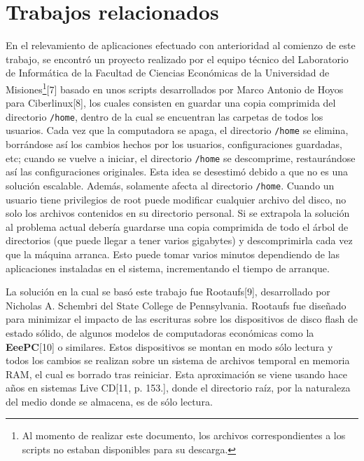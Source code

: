 \documentclass[final,narroweqnarray,inline,twoside]{ieee}
\newcommand{\itref}[1]{[{#1}]}
\begin{document}
\section{Trabajos relacionados}
En el relevamiento de aplicaciones efectuado con anterioridad al comienzo de este trabajo, se encontró un proyecto realizado por el equipo técnico del Laboratorio de Informática de la Facultad de Ciencias Económicas de la Universidad de Misiones\footnote{Al momento de realizar este documento, los archivos correspondientes a los scripts no estaban disponibles para su descarga.}\itref{7} basado en unos scripts desarrollados por Marco Antonio de Hoyos para Ciberlinux\itref{8}, los cuales consisten en guardar una copia comprimida del directorio \texttt{/home}, dentro de la cual se encuentran las carpetas de todos los usuarios. Cada vez que la computadora se apaga, el directorio \texttt{/home} se elimina, borrándose así los cambios hechos por los usuarios, configuraciones guardadas, etc; cuando se vuelve a iniciar, el directorio \texttt{/home} se descomprime, restaurándose así las configuraciones originales. Esta idea se desestimó debido a que no es una solución escalable. Además, solamente afecta al directorio \texttt{/home}. Cuando un usuario tiene privilegios de root puede modificar cualquier archivo del disco, no solo los archivos contenidos en su directorio personal. Si se extrapola la solución al problema actual debería guardarse una copia comprimida de todo el árbol de directorios (que puede llegar a tener varios gigabytes) y descomprimirla cada vez que la máquina arranca. Esto puede tomar varios minutos dependiendo de las aplicaciones instaladas en el sistema, incrementando el tiempo de arranque.

La solución en la cual se basó este trabajo fue Rootaufs\itref{9}, desarrollado por Nicholas A. Schembri del State College de Pennsylvania. Rootaufs fue diseñado para minimizar el impacto de las escrituras sobre los dispositivos de disco flash de estado sólido, de algunos modelos de computadoras económicas como la \textbf{EeePC}\itref{10} o similares. Estos dispositivos se montan en modo sólo lectura y todos los cambios se realizan sobre un sistema de archivos temporal en memoria RAM, el cual es borrado tras reiniciar. Esta aproximación se viene usando hace años en sistemas Live CD\itref{11, p. 153.}, donde el directorio raíz, por la naturaleza del medio donde se almacena, es de sólo lectura.
\end{document}

